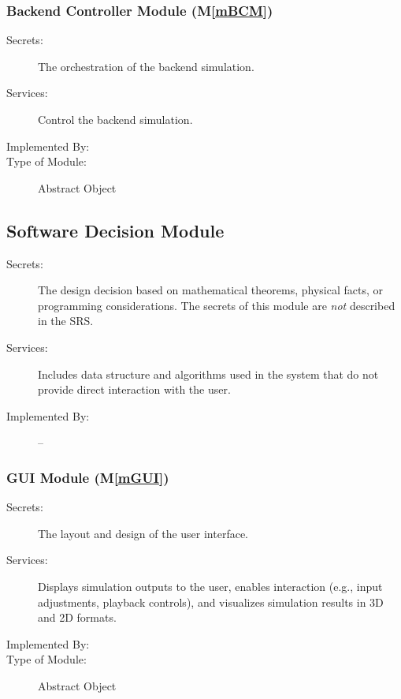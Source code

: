 \documentclass[12pt, titlepage]{article}
\newcommand{\mref}[1]{M\ref{#1}}
\begin{document}
\subsubsection{Backend Controller Module (\mref{mBCM})}

\begin{description}
\item[Secrets:] The orchestration of the backend simulation.
\item[Services:] Control the backend simulation.
\item[Implemented By:] \progname{}
\item[Type of Module:] Abstract Object
\end{description}



\subsection{Software Decision Module}

\begin{description}
\item[Secrets:] The design decision based on mathematical theorems, physical
  facts, or programming considerations. The secrets of this module are
  \emph{not} described in the SRS.
\item[Services:] Includes data structure and algorithms used in the system that
  do not provide direct interaction with the user. 
\item[Implemented By:] --
\end{description}

\subsubsection{GUI Module (\mref{mGUI})}

\begin{description}
\item[Secrets:] The layout and design of the user interface.
\item[Services:] Displays simulation outputs to the user, enables interaction (e.g., input adjustments, playback controls), and visualizes simulation results in 3D and 2D formats.
\item[Implemented By:] \progname{}
\item[Type of Module:] Abstract Object
\end{description}
\end{document}
